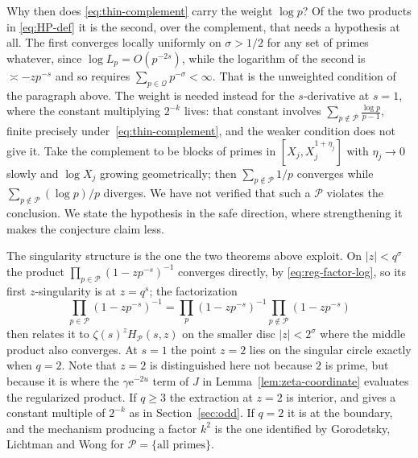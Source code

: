 \documentclass[11pt]{amsart}
\theoremstyle{plain}
\theoremstyle{definition}
\newcommand{\e}{\mathrm e}
\newcommand{\abs}[1]{\lvert #1\rvert}
\begin{document}
Why then does \eqref{eq:thin-complement} carry the weight $\log p$? Of the two
products in \eqref{eq:HP-def} it is the second, over the complement, that
needs a hypothesis at all. The first converges locally uniformly on
$\sigma>1/2$ for any set of primes whatever, since $\log L_p=O(p^{-2s})$,
while the logarithm of the second is $\asymp-zp^{-s}$ and so requires
$\sum_{p\in\mathcal Q}p^{-\sigma}<\infty$. That is the unweighted condition of
the paragraph above. The weight is needed instead for the $s$-derivative at
$s=1$, where the constant multiplying $2^{-k}$ lives: that constant involves
$\sum_{p\notin\mathcal P}\frac{\log p}{p-1}$, finite precisely
under~\eqref{eq:thin-complement}, and the weaker condition does not give it.
Take the complement to be blocks of primes in $[X_j,X_j^{1+\eta_j}]$ with
$\eta_j\to0$ slowly and $\log X_j$ growing geometrically; then
$\sum_{p\notin\mathcal P}1/p$ converges while
$\sum_{p\notin\mathcal P}(\log p)/p$ diverges. We have not verified that such
a $\mathcal P$ violates the conclusion. We state the hypothesis in the safe
direction, where strengthening it makes the conjecture claim less.

The singularity structure is the one the two theorems above exploit. On
$\abs z<q^\sigma$ the product $\prod_{p\in\mathcal P}(1-zp^{-s})^{-1}$
converges directly, by \eqref{eq:reg-factor-log}, so its first
$z$-singularity is at
$z=q^s$; the factorization
\[
 \prod_{p\in\mathcal P}(1-zp^{-s})^{-1}
  =\prod_p(1-zp^{-s})^{-1}\prod_{p\notin\mathcal P}(1-zp^{-s})
\]
then relates it to $\zeta(s)^zH_{\mathcal P}(s,z)$ on the smaller disc
$\abs z<2^\sigma$ where the middle product also converges. At $s=1$ the point
$z=2$ lies on the singular circle exactly when $q=2$. Note that $z=2$ is
distinguished here not because $2$ is prime, but because it is where the
$\gamma\e^{-2u}$ term of $J$ in Lemma~\ref{lem:zeta-coordinate} evaluates the
regularized product. If $q\geq3$ the extraction at $z=2$ is interior, and
gives a constant multiple of $2^{-k}$ as in Section~\ref{sec:odd}. If $q=2$ it is at the
boundary, and the mechanism producing a factor $k^2$ is the one identified by
Gorodetsky, Lichtman and Wong \cite{GLW} for
$\mathcal P=\{\text{all primes}\}$.
\end{document}
